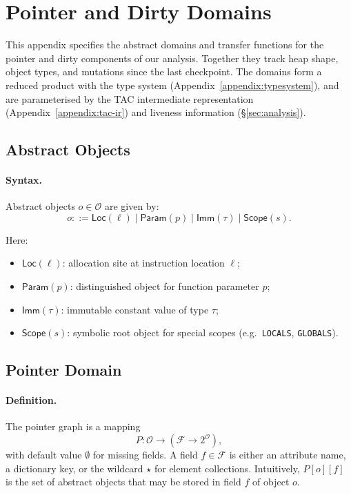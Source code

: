 \section{Pointer and Dirty Domains}
\label{appendix:pointer}

This appendix specifies the abstract domains and transfer functions for the pointer
and dirty components of our analysis.
Together they track heap shape, object types, and mutations since the last checkpoint.
The domains form a reduced product with the type system
(Appendix~\ref{appendix:typesystem}),
and are parameterised by the TAC intermediate representation
(Appendix~\ref{appendix:tac-ir}) and liveness information
(\S\ref{sec:analysis}).

\subsection{Abstract Objects}

\paragraph{Syntax.}
Abstract objects $o \in \mathcal{O}$ are given by:
\[
o ::= \mathsf{Loc}(\ell) \mid \mathsf{Param}(p) \mid \mathsf{Imm}(\tau) \mid \mathsf{Scope}(s).
\]

\noindent
Here:
\begin{itemize}
  \item $\mathsf{Loc}(\ell)$: allocation site at instruction location $\ell$;
  \item $\mathsf{Param}(p)$: distinguished object for function parameter $p$;
  \item $\mathsf{Imm}(\tau)$: immutable constant value of type $\tau$;
  \item $\mathsf{Scope}(s)$: symbolic root object for special scopes
        (e.g.\ \texttt{LOCALS}, \texttt{GLOBALS}).
\end{itemize}

\subsection{Pointer Domain}

\paragraph{Definition.}
The pointer graph is a mapping
\[
P : \mathcal{O} \to (\mathcal{F} \to 2^{\mathcal{O}}),
\]
with default value $\emptyset$ for missing fields.
A field $f \in \mathcal{F}$ is either an attribute name,
a dictionary key, or the wildcard $\star$ for element collections.
Intuitively, $P[o][f]$ is the set of abstract objects that may be
stored in field $f$ of object $o$.

